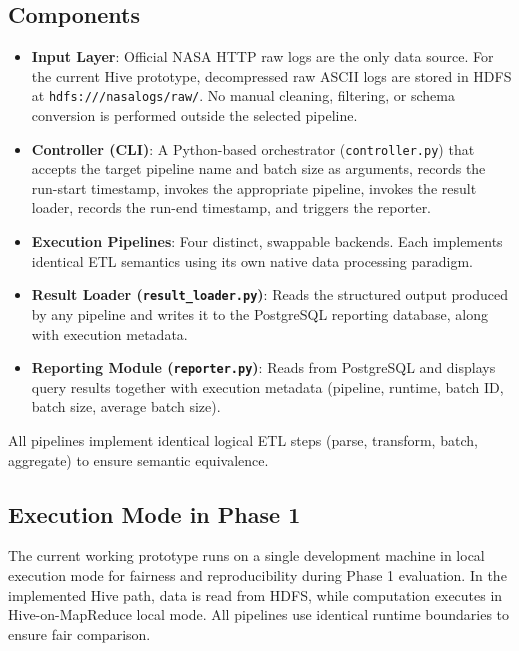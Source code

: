 \documentclass[12pt,a4paper]{article}
\begin{document}
\subsection{Components}
\begin{itemize}
    \item \textbf{Input Layer}: Official NASA HTTP raw logs are the only data source. For the current Hive prototype, decompressed raw ASCII logs are stored in HDFS at \texttt{hdfs:///nasalogs/raw/}. No manual cleaning, filtering, or schema conversion is performed outside the selected pipeline.
    \item \textbf{Controller (CLI)}: A Python-based orchestrator (\texttt{controller.py}) that accepts the target pipeline name and batch size as arguments, records the run-start timestamp, invokes the appropriate pipeline, invokes the result loader, records the run-end timestamp, and triggers the reporter.
    \item \textbf{Execution Pipelines}: Four distinct, swappable backends. Each implements identical ETL semantics using its own native data processing paradigm.
    \item \textbf{Result Loader (\texttt{result\_loader.py})}: Reads the structured output produced by any pipeline and writes it to the PostgreSQL reporting database, along with execution metadata.
    \item \textbf{Reporting Module (\texttt{reporter.py})}: Reads from PostgreSQL and displays query results together with execution metadata (pipeline, runtime, batch ID, batch size, average batch size).
\end{itemize}
All pipelines implement identical logical ETL steps (parse, transform, batch, aggregate) to ensure semantic equivalence.

\subsection{Execution Mode in Phase 1}
The current working prototype runs on a single development machine in local execution mode for fairness and reproducibility during Phase 1 evaluation. In the implemented Hive path, data is read from HDFS, while computation executes in Hive-on-MapReduce local mode. All pipelines use identical runtime boundaries to ensure fair comparison.
\end{document}
